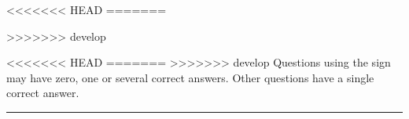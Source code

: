\documentclass[
    11pt,
]{scrartcl}
\newlength{\mylen}
\begin{document}
\begin{examcopy}[1]

<<<<<<< HEAD
=======

>>>>>>> develop
\setlength{\mylen}{\linewidth}
\addtolength{\mylen}{-16em}
\begin{minipage}{\linewidth}
    \begin{minipage}{16em}
    \end{minipage}
    \begin{minipage}{\mylen}
    \end{minipage}
\end{minipage}

\null\hfill\parbox[c]{0.9\linewidth}{\small
<<<<<<< HEAD
=======
>>>>>>> develop
Questions using the sign \multiSymbole{} may have zero, one or several correct answers.
Other questions have a single correct answer.
}\hfill\null

\rule[0pt]{\linewidth}{0.5pt} \\






\AMCcleardoublepage
\end{examcopy}
\end{document}
